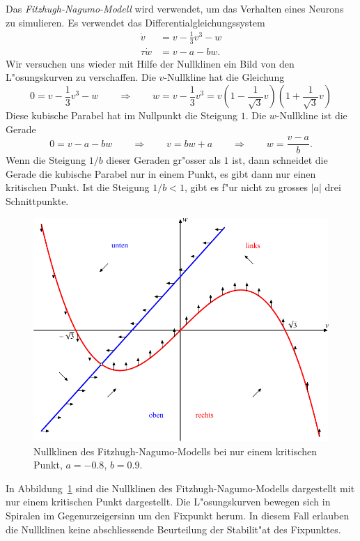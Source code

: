 \begin{beispiel}
Das {\em Fitzhugh-Nagumo-Modell} wird verwendet, um das Verhalten eines Neurons
zu simulieren.
Es verwendet das Differentialgleichungssystem
\begin{align*}
    \dot v&= v-\frac13v^3-w\\
\tau\dot w&= v-a-bw.
\end{align*}
Wir versuchen uns wieder mit Hilfe der Nullklinen ein Bild von den
L"osungskurven zu verschaffen.
Die $v$-Nullkline hat die Gleichung
\[
0=v-\frac13v^3-w
\qquad\Rightarrow\qquad
w=v-\frac13v^3 = v(1-{\textstyle\frac1{\sqrt{3}}}v)(1+{\textstyle\frac1{\sqrt{3}}}v)
\]
Diese kubische Parabel hat im Nullpunkt die Steigung $1$.
Die $w$-Nullkline ist die Gerade
\[
0=v-a-bw
\qquad\Rightarrow\qquad
v=bw+a
\qquad\Rightarrow\qquad
w = \frac{v-a}{b}.
\]
Wenn die Steigung $1/b$ dieser Geraden gr"osser als $1$ ist, dann schneidet
die Gerade die kubische Parabel nur in einem Punkt, es gibt dann nur
einen kritischen Punkt.
Ist die Steigung $1/b<1$, gibt es f"ur nicht zu grosses $|a|$ drei
Schnittpunkte.

\begin{figure}
\centering
\includegraphics{chapters/images/nullklinen-5.pdf}
\caption{Nullklinen des Fitzhugh-Nagumo-Modells bei nur einem kritischen Punkt,
$a=-0.8$, $b=0.9$.
\label{geometrie:nullklinen-fh-1}}
\end{figure}
In Abbildung~\ref{geometrie:nullklinen-fh-1} sind die Nullklinen des
Fitzhugh-Nagumo-Modells dargestellt mit nur einem kritischen Punkt dargestellt.
Die L"osungskurven bewegen sich in Spiralen im Gegenurzeigersinn
um den Fixpunkt herum.
In diesem Fall erlauben die Nullklinen keine abschliessende Beurteilung
der Stabilit"at des Fixpunktes.


\end{beispiel}
